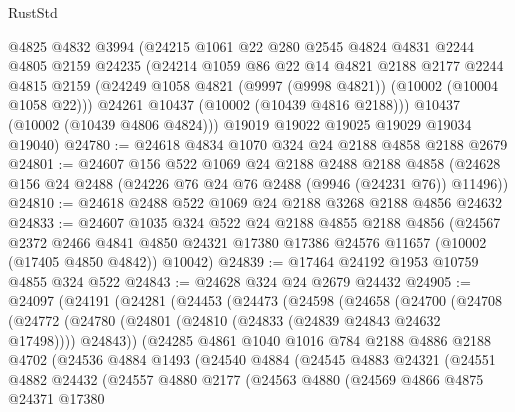 \begin{lexlean}{RustStd}
\begin{coremodule}
      @4825
      @4832
      @3994
      (@24215
        @1061
        @22
        @280
        @2545
        @4824
        @4831
        @2244
        @4805
        @2159
        @24235
        (@24214
          @1059
          @86
          @22
          @14
          @4821
          @2188
          @2177
          @2244
          @4815
          @2159
          (@24249 @1058 @4821 (@9997 (@9998 @4821)) (@10002 (@10004 @1058 @22)))
          @24261
          @10437
          (@10002 (@10439 @4816 @2188)))
        @10437
        (@10002 (@10439 @4806 @4824)))
      @19019
      @19022
      @19025
      @19029
      @19034
      @19040)
@24780 := @24618 @4834 @1070 @324 @24 @2188 @4858 @2188 @2679
@24801 := @24607
    @156
    @522
    @1069
    @24
    @2188
    @2488
    @2188
    @4858
    (@24628 @156 @24 @2488 (@24226 @76 @24 @76 @2488 (@9946 (@24231 @76)) @11496))
@24810 := @24618 @2488 @522 @1069 @24 @2188 @3268 @2188 @4856 @24632
@24833 := @24607
    @1035
    @324
    @522
    @24
    @2188
    @4855
    @2188
    @4856
    (@24567
      @2372
      @2466
      @4841
      @4850
      @24321
      @17380
      @17386
      @24576
      @11657
      (@10002 (@17405 @4850 @4842))
      @10042)
@24839 := @17464 @24192 @1953 @10759 @4855 @324 @522
@24843 := @24628 @324 @24 @2679 @24432
@24905 := @24097
    (@24191
      (@24281
        (@24453
          (@24473
            (@24598
              (@24658
                (@24700
                  (@24708
                    (@24772
                      (@24780 (@24801 (@24810 (@24833 (@24839 @24843 @24632 @17498)))) @24843))
                    (@24285
                      @4861
                      @1040
                      @1016
                      @784
                      @2188
                      @4886
                      @2188
                      @4702
                      (@24536
                        @4884
                        @1493
                        (@24540
                          @4884
                          (@24545
                            @4883
                            @24321
                            (@24551
                              @4882
                              @24432
                              (@24557
                                @4880
                                @2177
                                (@24563
                                  @4880
                                  (@24569
                                    @4866
                                    @4875
                                    @24371
                                    @17380

\end{coremodule}
\end{lexlean}
